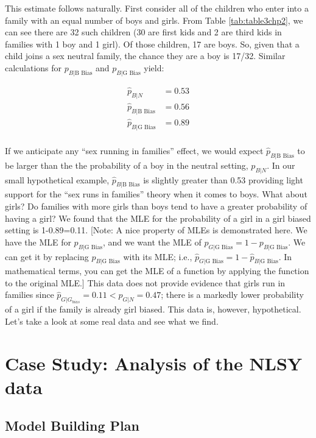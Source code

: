 \documentclass[
]{krantz}
\newcommand{\neutral}{p_{B|N}}
\newcommand{\gbias}{p_{B|\textrm{G Bias}}}
\newcommand{\bbias}{p_{B|\textrm{B Bias}}}
\begin{document}
This estimate follows naturally. First consider all of the children who enter into a family with an equal number of boys and girls. From Table \ref{tab:table3chp2}, we can see there are 32 such children (30 are first kids and 2 are third kids in families with 1 boy and 1 girl). Of those children, 17 are boys. So, given that a child joins a sex neutral family, the chance they are a boy is 17/32. Similar calculations for \(\bbias\) and \(\gbias\) yield:

\begin{align*}
 \hat{p}_{B|N} &= 0.53  \\  %
 \hat{p}_{B|\textrm{B Bias}} &= 0.56  \\%
 \hat{p}_{B|\textrm{G Bias}} &= 0.89  \\  
\end{align*}

If we anticipate any ``sex running in families'' effect, we would expect \(\hat{p}_{B|\textrm{B Bias}}\) to be larger than the the probability of a boy in the neutral setting, \(\neutral\). In our small hypothetical example, \(\hat{p}_{B|\textrm{B Bias}}\) is slightly greater than 0.53 providing light support for the ``sex runs in families'' theory when it comes to boys. What about girls? Do families with more girls than boys tend to have a greater probability of having a girl? We found that the MLE for the probability of a girl in a girl biased setting is 1-0.89=0.11. {[}Note: A nice property of MLEs is demonstrated here. We have the MLE for \(\gbias\), and we want the MLE of \(p_{G|\textrm{G Bias}}=1-\gbias\). We can get it by replacing \(\gbias\) with its MLE; i.e., \(\hat{p}_{G|\textrm{G Bias}}=1-\hat{p}_{B|\textrm{G Bias}}\). In mathematical terms, you can get the MLE of a function by applying the function to the original MLE.{]} This data does not provide evidence that girls run in families since \(\hat{p}_{G|G_{bias}} = 0.11 < \hat{p}_{G|N}=0.47\); there is a markedly lower probability of a girl if the family is already girl biased. This data is, however, hypothetical. Let's take a look at some real data and see what we find.

\hypertarget{case-study-analysis-of-the-nlsy-data}{%
\section{Case Study: Analysis of the NLSY data}\label{case-study-analysis-of-the-nlsy-data}}

\hypertarget{model-building-plan}{%
\subsection{Model Building Plan}\label{model-building-plan}}
\end{document}
